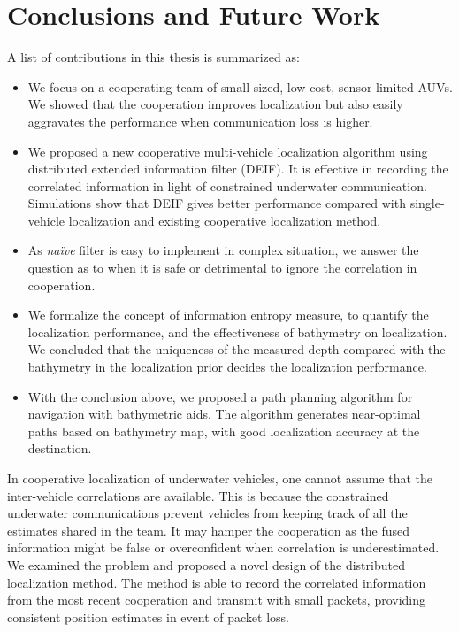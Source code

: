 \chapter{Conclusions and Future Work} %
\label{ch:conclusion}

A list of contributions in this thesis is summarized as:
\begin{itemize}
\item {We focus on a cooperating team of small-sized, low-cost, sensor-limited AUVs. We showed that the cooperation improves localization but also easily aggravates the performance when communication loss is higher.} 
\item {We proposed a new cooperative multi-vehicle localization algorithm using distributed extended information filter (DEIF). It is effective in recording the correlated information in light of constrained underwater communication. Simulations show that DEIF gives better performance compared with single-vehicle localization and existing cooperative localization method.}
\item {As \textit{na\"ive} filter is easy to implement in complex situation, we answer the question as to when it is safe or detrimental to ignore the correlation in cooperation.}
    \item {We formalize the concept of information entropy measure, to quantify the localization performance, and the effectiveness of bathymetry on localization. We concluded that the uniqueness of the measured depth compared with the bathymetry in the localization prior decides the localization performance.}
    \item {With the conclusion above, we proposed a path planning algorithm for navigation with bathymetric aids. The algorithm generates near-optimal paths based on bathymetry map, with good localization accuracy at the destination.}
\end{itemize}

In cooperative localization of underwater vehicles, one cannot assume that the inter-vehicle correlations are available. This is because the constrained underwater communications prevent vehicles from keeping track of all the estimates shared in the team. It may hamper the cooperation as the fused information might be false or overconfident when correlation is underestimated. We examined the problem and proposed a novel design of the distributed localization method. The method is able to record the correlated information from the most recent cooperation and transmit with small packets, providing consistent position estimates in event of packet loss.


